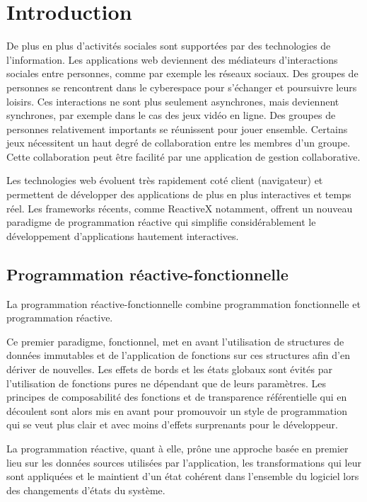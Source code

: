 \chapter{Introduction}

De plus en plus d'activités sociales sont supportées par des technologies de l'information. Les applications web deviennent des médiateurs d'interactions sociales entre personnes, comme par exemple les réseaux sociaux. Des groupes de personnes se rencontrent dans le cyberespace pour s'échanger et poursuivre leurs loisirs. Ces interactions ne sont plus seulement asynchrones, mais deviennent synchrones, par exemple dans le cas des jeux vidéo en ligne. Des groupes de personnes relativement importants se réunissent pour jouer ensemble. Certains jeux nécessitent un haut degré de collaboration entre les membres d'un groupe. Cette collaboration peut être facilité par une application de gestion collaborative.

Les technologies web évoluent très rapidement coté client (navigateur) et permettent de développer des applications de plus en plus interactives et temps réel. Les frameworks récents, comme ReactiveX notamment, offrent un nouveau paradigme de programmation réactive qui simplifie considérablement le développement d'applications hautement interactives.

\section{Programmation réactive-fonctionnelle}

La programmation réactive-fonctionnelle combine programmation fonctionnelle et programmation réactive.

Ce premier paradigme, fonctionnel, met en avant l'utilisation de structures de données immutables et de l'application de fonctions sur ces structures afin d'en dériver de nouvelles. Les effets de bords et les états globaux sont évités par l'utilisation de fonctions pures ne dépendant que de leurs paramètres. Les principes de composabilité des fonctions et de transparence référentielle qui en découlent sont alors mis en avant pour promouvoir un style de programmation qui se veut plus clair et avec moins d'effets surprenants pour le développeur.

La programmation réactive, quant à elle, prône une approche basée en premier lieu sur les données sources utilisées par l'application, les transformations qui leur sont appliquées et le maintient d'un état cohérent dans l'ensemble du logiciel lors des changements d'états du système.

